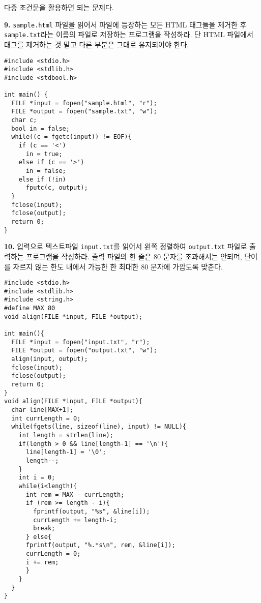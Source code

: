 \documentclass[a4paper,chapter,atbegshi]{oblivoir}
\begin{document}
다중 조건문을 활용하면 되는 문제다.
\hfill\break
\begin{mdframed}\textbf{9. }
  \texttt{sample.html} 파일을 읽어서 파일에 등장하는 모든 HTML 태그들을 제거한
  후 \texttt{sample.txt}라는 이름의 파일로 저장하는 프로그램을 작성하라. 
  단 HTML 파일에서 태그를 제거하는 것 말고 다른 부분은 그대로 유지되어야 한다.
\end{mdframed}
\begin{lstlisting}[style=C]
#include <stdio.h>
#include <stdlib.h>
#include <stdbool.h>

int main() {
  FILE *input = fopen("sample.html", "r");
  FILE *output = fopen("sample.txt", "w");
  char c;
  bool in = false; 
  while((c = fgetc(input)) != EOF){
    if (c == '<')
      in = true;
    else if (c == '>') 
      in = false;
    else if (!in) 
      fputc(c, output);
  }
  fclose(input);
  fclose(output);
  return 0;
}
\end{lstlisting}
\hfill\break
\begin{mdframed}\textbf{10. }
  입력으로 텍스트파일 \texttt{input.txt}를 읽어서 왼쪽 정렬하여 
  \texttt{output.txt} 파일로 출력하는 프로그램을 작성하라. 출력 파일의 한 줄은
  80 문자를 초과해서는 안되며, 단어를 자르지 않는 한도 내에서 가능한 한
  최대한 80 문자에 가깝도록 맞춘다.
\end{mdframed}
\begin{lstlisting}[style=C]
#include <stdio.h>
#include <stdlib.h>
#include <string.h>
#define MAX 80
void align(FILE *input, FILE *output);

int main(){
  FILE *input = fopen("input.txt", "r");
  FILE *output = fopen("output.txt", "w");
  align(input, output);
  fclose(input);
  fclose(output);
  return 0;
}
void align(FILE *input, FILE *output){
  char line[MAX+1]; 
  int currLength = 0;
  while(fgets(line, sizeof(line), input) != NULL){
    int length = strlen(line);
    if(length > 0 && line[length-1] == '\n'){
      line[length-1] = '\0';
      length--;
    }
    int i = 0;
    while(i<length){
      int rem = MAX - currLength;
      if (rem >= length - i){
        fprintf(output, "%s", &line[i]);
        currLength += length-i;
        break;
      } else{
      fprintf(output, "%.*s\n", rem, &line[i]);
      currLength = 0;
      i += rem;
      }
    }
  }
}
\end{lstlisting}
\end{document}
